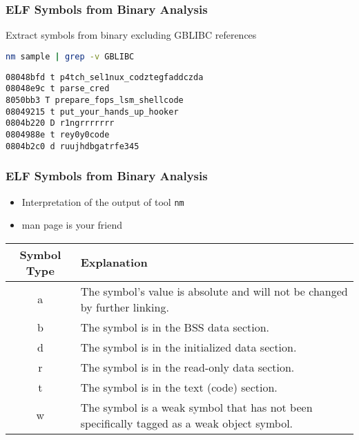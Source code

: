 \begin{frame}[fragile]
\frametitle{ELF Symbols from Binary Analysis}

Extract symbols from binary excluding GBLIBC references

\begin{lstlisting}[language=bash, basicstyle=\ttfamily, frame=single]
nm sample | grep -v GBLIBC
\end{lstlisting}


\begin{lstlisting}[basicstyle=\ttfamily, frame=single]
08048bfd t p4tch_sel1nux_codztegfaddczda
08048e9c t parse_cred
8050bb3 T prepare_fops_lsm_shellcode
08049215 t put_your_hands_up_hooker
0804b220 D r1ngrrrrrrr
0804988e t rey0y0code
0804b2c0 d ruujhdbgatrfe345
\end{lstlisting}
\end{frame}

\begin{frame}
\frametitle{ELF Symbols from Binary Analysis}

\begin{itemize}
    \item Interpretation of the output of tool \tt{nm}
    \item man page is your friend
\end{itemize}

\begin{tabular}{|c|p{}|}
\hline
\textbf{Symbol Type} & \textbf{Explanation} \\ \hline
a & The symbol's value is absolute and will not be changed by further linking. \\ \hline
b & The symbol is in the BSS data section. \\ \hline
d & The symbol is in the initialized data section. \\ \hline
r & The symbol is in the read-only data section. \\ \hline
t & The symbol is in the text (code) section. \\ \hline
w & The symbol is a weak symbol that has not been specifically tagged as a weak object symbol. \\ \hline
\end{tabular}

\end{frame}
